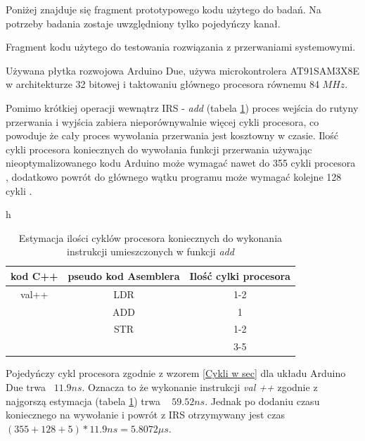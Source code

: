 \documentclass[a4paper,12pt]{article}
\begin{document}
Poniżej znajduje się fragment prototypowego kodu użytego do badań. Na potrzeby badania zostaje uwzględniony tylko pojedyńczy kanał.

\begin{kod}
        
        \caption{Fragment kodu użytego do testowania rozwiązania z przerwaniami systemowymi.}
        \label{code_ard_IRS}
\end{kod}


Używana płytka rozwojowa Arduino Due, używa microkontrolera AT91SAM3X8E w architekturze 32 bitowej i taktowaniu głównego procesora równemu 84 $MHz$.

Pomimo krótkiej operacji wewnątrz IRS - \textit{add} (tabela \ref{decompile add}) proces wejścia do rutyny przerwania i wyjścia zabiera nieporównywalnie więcej cykli procesora, co powoduje że cały proces wywołania przerwania jest kosztowny w czasie. 
Ilość cykli procesora koniecznych do wywołania funkcji przerwania używając nieoptymalizowanego kodu Arduino może wymagać nawet do 355 cykli procesora \cite{ard_opt_git}, dodatkowo powrót do głównego wątku programu może wymagać kolejne 128 cykli \cite{ard_opt_git}.

\begin{table}{h}
        \begin{center}
        \caption{Estymacja ilości cyklów procesora koniecznych do wykonania instrukcji umieszczonych w funkcji \textit{add} }
        \label{decompile add}
        \begin{tabular}{c|c|c}
                kod C++ & pseudo kod Asemblera & Ilość cylki procesora \cite{cycles} \\ \hline
                val++ & LDR & 1-2 \\
                        & ADD & 1 \\
                        & STR & 1-2 \\ 
                        \hline \hline
                        &   &  3-5 
        \end{tabular}
        \end{center}
\end{table}

Pojedyńczy cykl procesora zgodnie z wzorem \ref{Cykli w sec} dla układu Arduino Due trwa ~$ 11.9 ns $. 
Oznacza to że wykonanie instrukcji \textit{val ++} zgodnie z najgorszą estymacja (tabela \ref{decompile add}) trwa ~ $59.52 ns$. 
Jednak po dodaniu czasu koniecznego na wywołanie i powrót z IRS otrzymywany jest czas $ (355 + 128 + 5) * 11.9 ns =  5.8072 \mu s $. 
\end{document}
